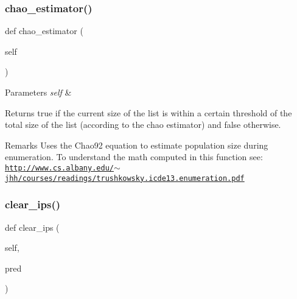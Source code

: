 \subsubsection{\texorpdfstring{chao\+\_\+estimator()}{chao\_estimator()}}
{\footnotesize\ttfamily def chao\+\_\+estimator (\begin{DoxyParamCaption}\item[{}]{self }\end{DoxyParamCaption})}


\begin{DoxyParams}{Parameters}
{\em self} & \\
\hline
\end{DoxyParams}
\begin{DoxyReturn}{Returns}
true if the current size of the list is within a certain threshold of the total size of the list (according to the chao estimator) and false otherwise. 
\end{DoxyReturn}
\begin{DoxyRemark}{Remarks}
Uses the Chao92 equation to estimate population size during enumeration. To understand the math computed in this function see\+: \href{http://www.cs.albany.edu/~jhh/courses/readings/trushkowsky.icde13.enumeration.pdf}{\tt http\+://www.\+cs.\+albany.\+edu/$\sim$jhh/courses/readings/trushkowsky.\+icde13.\+enumeration.\+pdf} 
\end{DoxyRemark}
\mbox{\label{classdynamicfilterapp_1_1models_1_1_join_aaf3c24b85bb49707bf5b8ab6da21068c}} 
\subsubsection{\texorpdfstring{clear\+\_\+ips()}{clear\_ips()}}
{\footnotesize\ttfamily def clear\+\_\+ips (\begin{DoxyParamCaption}\item[{}]{self,  }\item[{}]{pred }\end{DoxyParamCaption})}

\mbox{\label{classdynamicfilterapp_1_1models_1_1_join_aced24bb06eb985f2929181e535212ffb}} 
